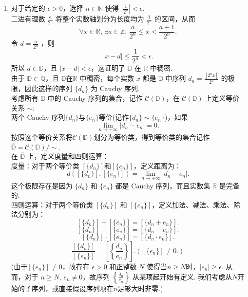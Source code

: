 \begin{enumerate}
\begin{solution}
\begin{enumerate}
        \item[(b)] 对于给定的 $\epsilon>0$，选择 $n\in\mathbb{N}$ 使得 $\displaystyle \left|\frac{1}{2^n}\right|<\epsilon$.\\
        二进有理数 $\displaystyle\frac{a}{2^n}$ 将整个实数轴划分为长度均为 $\displaystyle \frac{1}{2^n}$ 的区间，从而
        \[
        \forall x\in\mathbb{R},\,\exists a\in\mathbb{Z}:\,\frac{a}{2^n}\leq x<\frac{a+1}{2^n}.
        \]
        令 $\displaystyle d=\frac{a}{2^n}$ ，则
        \[
        \left|x-d\right|\leq \frac{1}{2^n}<\epsilon.
        \]
        所以 $d\in \mathbb{D}$，且 $\displaystyle\left|x-d\right|<\epsilon$，这证明了 $\textbf{$\mathbb{D}$ 在 $\mathbb{R}$ 中稠密}$.\\
        由于 $\mathbb{D}\subset\mathbb{Q}$，且 $\mathbb{D}$在$\mathbb{R}$ 中稠密，每个实数 $x$ 都是 $\mathbb{D}$ 中序列 $\displaystyle d_{n}=\frac{[2^nx]}{2^n}$ 的极限，因此这样的序列 $\{d_{n}\}$ 为 Cauchy 序列.\\
        考虑所有 $\mathbb{D}$ 中的 Cauchy 序列的集合，记作 $\mathcal{C}(\mathbb{D})$，在 $\mathcal{C}(\mathbb{D})$ 上定义等价关系 $\sim$:\\
        两个 Cauchy 序列$\{d_{n}\}$与$\{e_{n}\}$等价(记作$\{d_{n}\}\sim\{e_{n}\}$)，如果
        \[
        \lim_{n\to +\infty}\left|d_{n}-e_{n}\right|=0.
        \]
        按照这个等价关系将$\mathcal{C}(\mathbb{D})$划分为等价类，得到等价类的集合记作 $\overline{\mathbb{D}}=\mathcal{C}(\mathbb{D})/\sim$.\\
        在 $\overline{\mathbb{D}}$ 上，定义度量和四则运算：\\
        $\textbf{度量}$：对于两个等价类 $[\{d_{n}\}]$和$[\{e_{n}\}]$，定义距离为：
        \[
        d([\{d_{n}\}],[\{e_{n}\}])=\lim_{n\to +\infty}\left|d_{n}-e_{n}\right|.
        \]
        这个极限存在是因为 $\{d_{n}\}$ 和 $\{e_{n}\}$ 都是 Cauchy 序列，而且实数集 $\mathbb{R}$ 是完备的.\\
        $\textbf{四则运算}$：对于两个等价类 $[\{d_{n}\}]$ 和 $[\{e_{n}\}]$，定义加法、减法、乘法、除法分别为：
        \[
        [\{d_{n}\}]+[\{e_{n}\}]=[\{d_{n}+e_{n}\}].
        \]
        \[
        [\{d_{n}\}]-[\{e_{n}\}]=[\{d_{n}-e_{n}\}].
        \]
        \[
        [\{d_{n}\}]\cdot[\{e_{n}\}]=[\{d_{n}\cdot e_{n}\}].
        \]
        \[
        \frac{[\{d_{n}\}]}{[\{e_{n}\}]}=\left[\left\{\frac{d_{n}}{e_{n}}\right\}\right].([\{e_{n}\}]\neq 0.)
        \]
        (由于$[\{e_{n}\}]\neq 0$，故存在 $\epsilon>0$ 和正整数 $N$ 使得当$n\geq N$时，$\left|e_{n}\right|\geq \epsilon$. 
        从而，对于 $n\geq N,\,e_{n}\neq 0$，故序列 $\displaystyle\left\{\frac{d_{n}}{e_{n}}\right\}$ 从某项起开始有定义. 我们考虑从$N$开始的子序列，或直接假设序列项在$n$足够大时非零.)\\

\end{enumerate}
\end{solution}
\end{enumerate}
